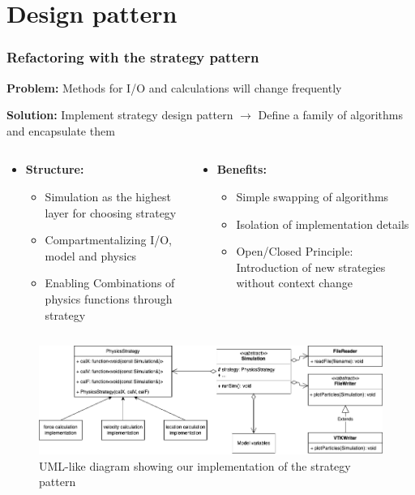 \section{Design pattern}

\begin{frame}
    \frametitle{Refactoring with the strategy pattern}
    \vspace{-5pt}
    \textbf{Problem:} Methods for I/O and calculations will change frequently

    \vspace{-5pt}
    \textbf{Solution:} Implement strategy design pattern $\rightarrow$ Define a family of algorithms and encapsulate them

    \vspace{-5pt}
    \begin{columns}
        \begin{column}{0.5\textwidth}
            \begin{itemize}
                \item \textbf{Structure: } 
                \vspace{-5pt}
                \begin{itemize}
                    \item Simulation as the highest layer for choosing strategy
                    \item Compartmentalizing I/O, model and physics
                    \item Enabling Combinations of physics functions through strategy
                \end{itemize}
            \end{itemize}
        \end{column}
        \begin{column}{0.5\textwidth}
            \begin{itemize}
                \item \textbf{Benefits: }
                    \begin{itemize}
                        \item Simple swapping of algorithms
                        \item Isolation of implementation details
                        \item Open/Closed Principle: Introduction of new strategies without context change
                    \end{itemize}
            \end{itemize}
        \end{column}
    \end{columns}

    \begin{figure}
        \includegraphics[width=.8\columnwidth]{../../../report/report1/res/strategy_long.png}
        \caption{UML-like diagram showing our implementation of the strategy pattern}
    \end{figure}

\end{frame}
